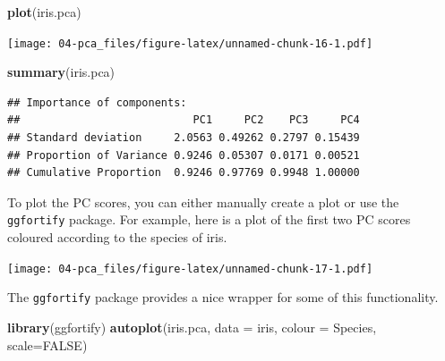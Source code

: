 \documentclass[
]{book}
\newenvironment{Shaded}{\begin{snugshade}}{\end{snugshade}}
\newcommand{\AttributeTok}[1]{\textcolor[rgb]{0.13,0.29,0.53}{#1}}
\newcommand{\ConstantTok}[1]{\textcolor[rgb]{0.56,0.35,0.01}{#1}}
\newcommand{\DecValTok}[1]{\textcolor[rgb]{0.00,0.00,0.81}{#1}}
\newcommand{\FunctionTok}[1]{\textcolor[rgb]{0.13,0.29,0.53}{\textbf{#1}}}
\newcommand{\NormalTok}[1]{#1}
\newcommand{\OtherTok}[1]{\textcolor[rgb]{0.56,0.35,0.01}{#1}}
\newcommand{\SpecialCharTok}[1]{\textcolor[rgb]{0.81,0.36,0.00}{\textbf{#1}}}
\newcommand{\StringTok}[1]{\textcolor[rgb]{0.31,0.60,0.02}{#1}}
\theoremstyle{definition}
\theoremstyle{definition}
\theoremstyle{definition}
\theoremstyle{definition}
\theoremstyle{remark}
\begin{document}
\begin{Shaded}
\begin{Highlighting}[]
\FunctionTok{plot}\NormalTok{(iris.pca)}
\end{Highlighting}
\end{Shaded}

\texttt{[image: 04-pca\_files/figure-latex/unnamed-chunk-16-1.pdf]}

\begin{Shaded}
\begin{Highlighting}[]
\FunctionTok{summary}\NormalTok{(iris.pca)}
\end{Highlighting}
\end{Shaded}

\begin{verbatim}
## Importance of components:
##                           PC1     PC2    PC3     PC4
## Standard deviation     2.0563 0.49262 0.2797 0.15439
## Proportion of Variance 0.9246 0.05307 0.0171 0.00521
## Cumulative Proportion  0.9246 0.97769 0.9948 1.00000
\end{verbatim}

To plot the PC scores, you can either manually create a plot or use the \texttt{ggfortify} package. For example, here is a plot of the first two PC scores coloured according to the species of iris.

\begin{Shaded}
\end{Shaded}

\texttt{[image: 04-pca\_files/figure-latex/unnamed-chunk-17-1.pdf]}

The \texttt{ggfortify} package provides a nice wrapper for some of this functionality.

\begin{Shaded}
\begin{Highlighting}[]
\FunctionTok{library}\NormalTok{(ggfortify)}
\FunctionTok{autoplot}\NormalTok{(iris.pca, }\AttributeTok{data =}\NormalTok{ iris, }\AttributeTok{colour =} \StringTok{\textquotesingle{}Species\textquotesingle{}}\NormalTok{, }\AttributeTok{scale=}\ConstantTok{FALSE}\NormalTok{)}
\end{Highlighting}
\end{Shaded}
\end{document}
